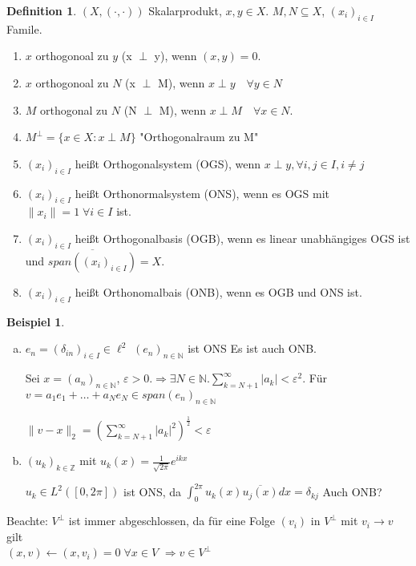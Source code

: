 \documentclass[ngerman]{report}
\theoremstyle{plain}%
\theoremstyle{definition}%
\newtheorem{definition}[thm]{Definition}
\newtheorem{bsp}[thm]{Beispiel}
\theoremstyle{myStyle}
\newcommand{\Z}{\mathbb{Z}}
\newcommand{\N}{\mathbb{N}}
\newcommand{\norm}[1]{\|#1\|}
\newcommand{\df}[1][]{%
	\overset{#1}{\Rightarrow}
}
\newcommand{\qmarks}[1]{"#1"}
\newcommand{\xf}{(x_i)_{i\in I}}
\newcommand{\ff}[3]{(#1_#2)_{#2\in#3}}
\newcommand{\SP}{(\cdot,\cdot)}
\begin{document}
	\begin{definition}
		$(X,\SP)$ Skalarprodukt, $x,y\in X$. $M,N \subseteq X$, $(x_i)_{i\in I}$ Famile.
		\begin{enumerate}
			\item $x$ orthogonoal zu $y$ (x $\perp$ y), wenn $(x,y) = 0$.
			\item $x$ orthogonoal zu $N$ (x $\perp$ M), wenn $x \perp y\quad \forall y\in N$
			\item $M$ orthogonal zu $N$ (N $\perp$ M), wenn $x \perp M\quad \forall x\in N$.
			\item $M^\perp = \{x\in X: x\perp M\}$ \qmarks{Orthogonalraum zu M}
			\item $\xf$ heißt Orthogonalsystem (OGS), wenn $x \perp y, \forall i,j \in I, i\neq j$
			\item $\xf$ heißt Orthonormalsystem (ONS), wenn es OGS mit $\|x_i \| = 1 \; \forall i \in I$ ist. 
			\item $\xf$ heißt Orthogonalbasis (OGB), wenn es linear unabhängiges OGS ist und $\overline{span(\xf)} = X$.
			\item $\xf$ heißt Orthonomalbais (ONB), wenn es OGB und ONS ist.	
		\end{enumerate}
	\end{definition}
	\begin{bsp}
		\begin{enumerate}[a)]
			\item $e_n = (\delta_{in})_{i\in I} \in \ell^2$ $(e_n)_{n\in \N}$ ist ONS
			Es ist auch ONB.\par
			Sei $x = (a_n)_{n\in \N}$, $\varepsilon > 0. \df \exists N \in \N. \sum_{k=N+1}^\infty |a_k| < \varepsilon^2$.
			Für $v = a_1e_1 + \dots + a_Ne_N \in span(e_n)_{n\in\N}$ \par
			$\norm{v - x }_2 = \left( \sum_{k = N +1}^\infty |a_k|^2\right)^{\frac{1}{2}} < \varepsilon$

			\item $\ff{u}{k}{\Z}$ mit $u_k(x) = \frac{1}{\sqrt{2\pi}} e^{ikx}$ \par
			$u_k \in L^2([0,2\pi])$ ist ONS, da $\int_0^{2\pi} u_k(x) \overline{u_j(x)} dx = \delta_{kj}$ Auch ONB?
		\end{enumerate}
		Beachte: $V^\perp$ ist immer abgeschlossen, da für eine Folge $(v_i)$ in $V^\perp$ mit $v_i \to v$ gilt\\ $(x,v) \leftarrow (x,v_i) = 0 \; \forall x\in V$ $\df v \in V^\perp$

	\end{bsp}
\end{document}
